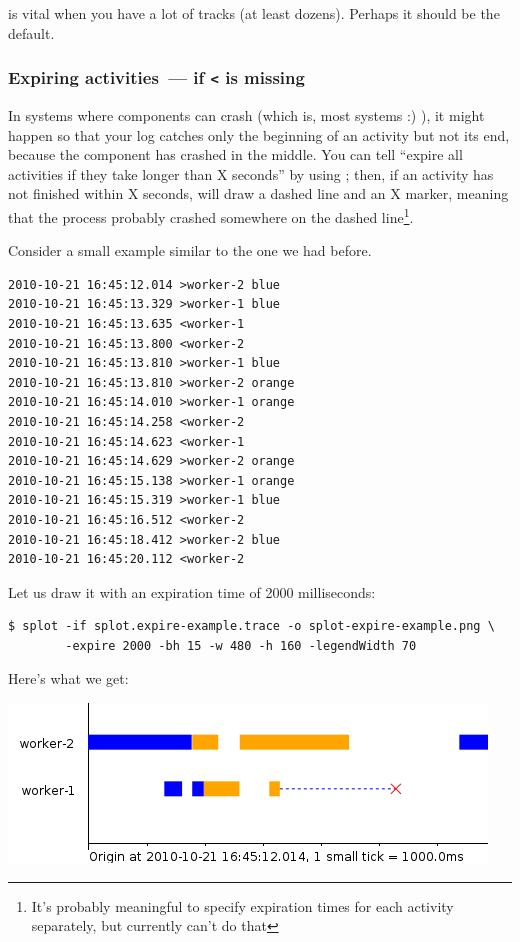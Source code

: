\documentclass{article}
\begin{document}
 is vital when you have a lot of tracks (at least dozens). Perhaps it should be the default.

\subsubsection{Expiring activities~--- if \texttt{<} is missing}

In systems where components can crash (which is, most systems :) ), it might happen so that your log catches only the beginning of an activity but not its end, because the component has crashed in the middle. You can tell \splot{} ``expire all activities if they take longer than X seconds'' by using ; then, if an activity has not finished within X seconds, \splot{} will draw a dashed line and an X marker, meaning that the process probably crashed somewhere on the dashed line\footnote{It's probably meaningful to specify expiration times for each activity separately, but currently \splot{} can't do that}.

Consider a small example similar to the one we had before.

\begin{verbatim}
2010-10-21 16:45:12.014 >worker-2 blue
2010-10-21 16:45:13.329 >worker-1 blue
2010-10-21 16:45:13.635 <worker-1
2010-10-21 16:45:13.800 <worker-2
2010-10-21 16:45:13.810 >worker-1 blue
2010-10-21 16:45:13.810 >worker-2 orange
2010-10-21 16:45:14.010 >worker-1 orange
2010-10-21 16:45:14.258 <worker-2
2010-10-21 16:45:14.623 <worker-1
2010-10-21 16:45:14.629 >worker-2 orange
2010-10-21 16:45:15.138 >worker-1 orange
2010-10-21 16:45:15.319 >worker-1 blue
2010-10-21 16:45:16.512 <worker-2
2010-10-21 16:45:18.412 >worker-2 blue
2010-10-21 16:45:20.112 <worker-2
\end{verbatim}

Let us draw it with an expiration time of 2000 milliseconds:

\pagebreak
\begin{verbatim}
$ splot -if splot.expire-example.trace -o splot-expire-example.png \
        -expire 2000 -bh 15 -w 480 -h 160 -legendWidth 70
\end{verbatim}

Here's what we get:

\centerline{\includegraphics[scale=0.5]{pics/splot/splot-expire-example.png}}
\end{document}

